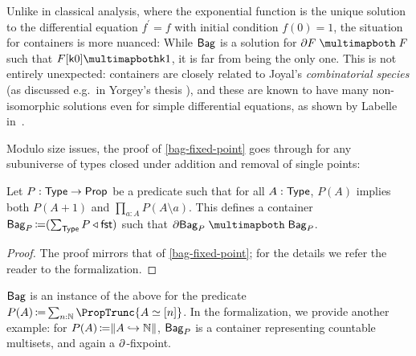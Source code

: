 Unlike in classical analysis, where the exponential function is the unique solution to
the differential equation \( f^{\prime} = f \) with initial condition \( f(0) = 1 \),
the situation for containers is more nuanced:
While \( \operatorname{\mathsf{Bag}} \) is a solution for \( \CartIso{\Der{F}}{F} \) such that \( { F[\CConst{0}] \CartEquiv \CConst{1} } \),
it is far from being the only one.
This is not entirely unexpected:
containers are closely related to Joyal's \emph{combinatorial species}
(as discussed e.g.~in Yorgey's thesis \cite[67]{Yorgey2014CombinatorialSpeciesLabelled}),
and these are known to have many non-isomorphic solutions even for simple differential equations,
as shown by Labelle in~\cite{Labelle1986combinatorialdifferentialequations}.

Modulo size issues, the proof of \autoref{bag-fixed-point} goes through for any subuniverse
of types closed under addition and removal of single points:
\begin{proposition}
  Let \( P : \operatorname{\mathsf{Type}} \to \operatorname{\mathsf{Prop}} \) be a predicate
  such that for all \( A : \operatorname{\mathsf{Type}} \), \( P(A) \) implies both \( P(A + 1) \)
  and \( \prod_{a : A} P(A \setminus a) \).
  This defines a container
  \( \operatorname{\mathsf{Bag}}_P \operatorname{\mathrel{\coloneq}} (\sum_{\operatorname{\mathsf{Type}}} P\mathbin{\triangleleft}\operatorname{\mathsf{fst}}) \)
  such that \( \CartIso{\Der{\Bag_P}}{\Bag_P} \). \qedhere
  \begin{proof}
    The proof mirrors that of \autoref{bag-fixed-point};
    for the details we refer the reader to the formalization.
  \end{proof}
\end{proposition}
\( \operatorname{\mathsf{Bag}} \) is an instance of the above for the predicate \( P(A) \DefEq \sum_{n : \Nat} \PropTrunc{A \simeq \Fin{n}} \).
In the formalization, we provide another example:
for \( P(A) \operatorname{\mathrel{\coloneq}} \lVert A \hookrightarrow \operatorname{\mathbb{N}} \rVert \),
\( \operatorname{\mathsf{Bag}}_P \) is a container representing countable multisets,
and again a \( \partial{} \)-fixpoint.

